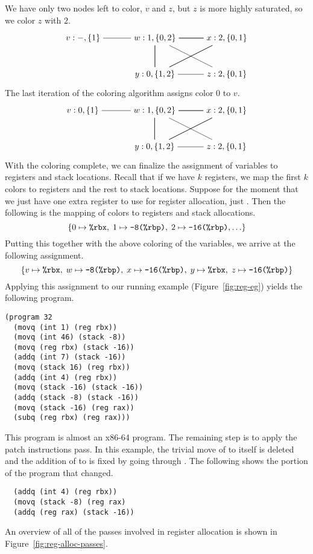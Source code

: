 \documentclass[11pt]{book}
\begin{document}
We have only two nodes left to color, $v$ and $z$, but $z$ is
more highly saturated, so we color $z$ with $2$.
\[
\begin{tikzpicture}[baseline=(current  bounding  box.center)]
\node (v) at (0,0)   {$v:-,\{1\}$};
\node (w) at (3,0)   {$w:1,\{0,2\}$};
\node (x) at (6,0)   {$x:2,\{0,1\}$};
\node (y) at (3,-1.5)  {$y:0,\{1,2\}$};
\node (z) at (6,-1.5)  {$z:2,\{0,1\}$};
\draw (v) to (w);
\foreach \i in {w,x,y} 
{
  \foreach \j in {w,x,y}
  { 
    \draw (\i) to (\j);
  }
}
\draw (z) to (w);
\draw (z) to (y);
\end{tikzpicture}
\]
The last iteration of the coloring algorithm assigns color $0$ to $v$.
\[
\begin{tikzpicture}[baseline=(current  bounding  box.center)]
\node (v) at (0,0)   {$v:0,\{1\}$};
\node (w) at (3,0)   {$w:1,\{0,2\}$};
\node (x) at (6,0)   {$x:2,\{0,1\}$};
\node (y) at (3,-1.5)  {$y:0,\{1,2\}$};
\node (z) at (6,-1.5)  {$z:2,\{0,1\}$};
\draw (v) to (w);
\foreach \i in {w,x,y} 
{
  \foreach \j in {w,x,y}
  { 
    \draw (\i) to (\j);
  }
}
\draw (z) to (w);
\draw (z) to (y);
\end{tikzpicture}
\]
With the coloring complete, we can finalize the assignment of
variables to registers and stack locations. Recall that if we have $k$
registers, we map the first $k$ colors to registers and the rest to
stack locations.  Suppose for the moment that we just have one extra
register to use for register allocation, just . Then the
following is the mapping of colors to registers and stack allocations.
\[
  \{ 0 \mapsto \texttt{\%rbx}, \; 1 \mapsto \texttt{-8(\%rbp)}, \; 2 \mapsto \texttt{-16(\%rbp)}, \ldots \}
\]
Putting this together with the above coloring of the variables, we
arrive at the following assignment.
\[
  \{ v \mapsto \texttt{\%rbx}, \;
  w \mapsto \texttt{-8(\%rbp)},  \;
  x \mapsto \texttt{-16(\%rbp)}, \;
  y \mapsto \texttt{\%rbx},  \;
  z\mapsto \texttt{-16(\%rbp)} \}
\]
Applying this assignment to our running example
(Figure~\ref{fig:reg-eg}) yields the following program.
\begin{lstlisting}
(program 32
  (movq (int 1) (reg rbx))
  (movq (int 46) (stack -8))
  (movq (reg rbx) (stack -16))
  (addq (int 7) (stack -16))
  (movq (stack 16) (reg rbx))
  (addq (int 4) (reg rbx))
  (movq (stack -16) (stack -16))
  (addq (stack -8) (stack -16))
  (movq (stack -16) (reg rax))
  (subq (reg rbx) (reg rax)))
\end{lstlisting}
This program is almost an x86-64 program. The remaining step is to apply
the patch instructions pass. In this example, the trivial move of
 to itself is deleted and the addition of
 to  is fixed by going through
. The following shows the portion of the program that
changed.
\begin{lstlisting}
  (addq (int 4) (reg rbx))
  (movq (stack -8) (reg rax)
  (addq (reg rax) (stack -16))
\end{lstlisting}
An overview of all of the passes involved in register allocation is
shown in Figure~\ref{fig:reg-alloc-passes}.
\end{document}
